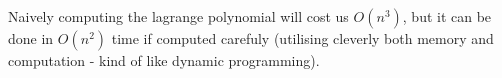 Naively computing the lagrange polynomial will cost us $O(n^3)$, 
but it can be done in $O(n^2)$ time if computed carefuly (utilising cleverly both 
memory and computation - kind of like dynamic programming).












